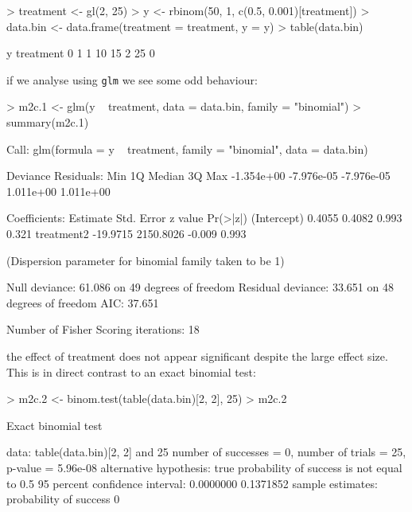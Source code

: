 \documentclass{article}
\begin{document}
\begin{Schunk}
\begin{Sinput}
> treatment <- gl(2, 25)
> y <- rbinom(50, 1, c(0.5, 0.001)[treatment])
> data.bin <- data.frame(treatment = treatment, y = y)
> table(data.bin)
\end{Sinput}
\begin{Soutput}
         y
treatment  0  1
        1 10 15
        2 25  0
\end{Soutput}
\end{Schunk}
 
if we analyse using \texttt{glm} we see some odd behaviour:

\begin{Schunk}
\begin{Sinput}
> m2c.1 <- glm(y ~ treatment, data = data.bin, family = "binomial")
> summary(m2c.1)
\end{Sinput}
\begin{Soutput}
Call:
glm(formula = y ~ treatment, family = "binomial", data = data.bin)

Deviance Residuals: 
       Min          1Q      Median          3Q         Max  
-1.354e+00  -7.976e-05  -7.976e-05   1.011e+00   1.011e+00  

Coefficients:
             Estimate Std. Error z value Pr(>|z|)
(Intercept)    0.4055     0.4082   0.993    0.321
treatment2   -19.9715  2150.8026  -0.009    0.993

(Dispersion parameter for binomial family taken to be 1)

    Null deviance: 61.086  on 49  degrees of freedom
Residual deviance: 33.651  on 48  degrees of freedom
AIC: 37.651

Number of Fisher Scoring iterations: 18
\end{Soutput}
\end{Schunk}

the effect of treatment does not appear significant despite the large effect size. This is in direct contrast to an exact binomial test: 

\begin{Schunk}
\begin{Sinput}
> m2c.2 <- binom.test(table(data.bin)[2, 2], 25)
> m2c.2
\end{Sinput}
\begin{Soutput}
	Exact binomial test

data:  table(data.bin)[2, 2] and 25 
number of successes = 0, number of trials = 25, p-value = 5.96e-08
alternative hypothesis: true probability of success is not equal to 0.5 
95 percent confidence interval:
 0.0000000 0.1371852 
sample estimates:
probability of success 
                     0 
\end{Soutput}
\end{Schunk}
\end{document}
